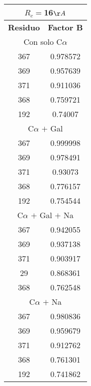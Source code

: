 \begin{tabular}[c]{|c|c|}
\multicolumn{2}{c}{$R_c=$16$\AA$}\\\hline
\textbf{Residuo}&\textbf{Factor B}\\\hline
\multicolumn{2}{c}{Con solo C$\alpha$}\\\hline
       367&  0.978572\\
       369&  0.957639\\
       371&  0.911036\\
       368&  0.759721\\
       192&   0.74007\\
\hline
\multicolumn{2}{c}{C$\alpha$ $+$ Gal}\\\hline
       367&  0.999998\\
       369&  0.978491\\
       371&   0.93073\\
       368&  0.776157\\
       192&  0.754544\\
\hline
\multicolumn{2}{c}{C$\alpha$ $+$ Gal $+$ Na}\\\hline
       367&  0.942055\\
       369&  0.937138\\
       371&  0.903917\\
        29&  0.868361\\
       368&  0.762548\\
\hline
\multicolumn{2}{c}{C$\alpha$ $+$ Na}\\\hline
       367&  0.980836\\
       369&  0.959679\\
       371&  0.912762\\
       368&  0.761301\\
       192&  0.741862\\
\hline
\end{tabular}
